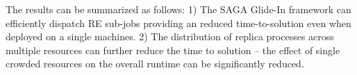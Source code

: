 \documentclass{rspublic}
\newcommand{\alnote}[1]{ {\textcolor{blue} { ***AL: #1 }}}
\newcommand{\alnote}[1]{}
\begin{document}
{The results can be summarized as follows: 1) The SAGA Glide-In
framework can efficiently dispatch RE sub-jobs providing an reduced
time-to-solution even when deployed on a single machines.  2) The
distribution of replica processes across multiple resources can
further reduce the time to solution -- the effect of single crowded
resources on the overall runtime can be significantly reduced.



         
% 
% 
% 
% 
% 

}
\end{document}
